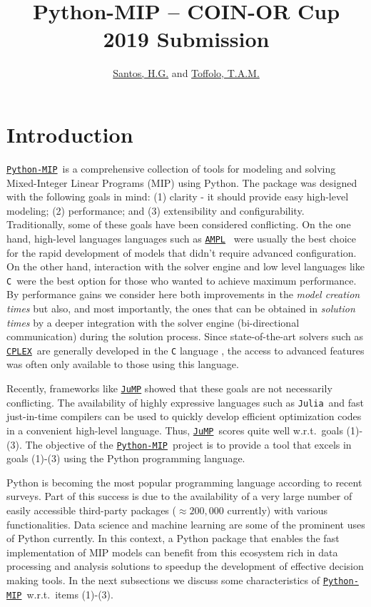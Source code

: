 \documentclass{article}
\title{Python-MIP -- COIN-OR Cup 2019 Submission }
\author{\href{http://www.decom.ufop.br/haroldo/}{Santos, H.G.} and \href{http://www.toffolo.com.br}{Toffolo, T.A.M.}}
\def\C{\texttt{C}}
\def\CPLEX{\href{https://www.ibm.com/analytics/cplex-optimizer}{\texttt{CPLEX}\textsuperscript{\textregistered}}}
\def\JuMP{\href{https://github.com/JuliaOpt/JuMP.jl}{\texttt{JuMP}}}
\def\Julia{\texttt{Julia}}
\def\PythonMIP{\href{https://github.com/coin-or/python-mip}{\texttt{Python-MIP}}}
\def\AMPL{\href{https://ampl.com}{\texttt{AMPL}}}
\begin{document}
\maketitle

\section{Introduction}

\PythonMIP\ is a comprehensive collection of tools for modeling and solving Mixed-Integer Linear Programs (MIP) using Python. 
The package was designed with the following goals in mind: (1) clarity - it should provide easy high-level modeling; (2) performance; and (3) extensibility and configurability.
Traditionally, some of these goals have been considered conflicting. 
On the one hand, high-level languages languages such as \AMPL\ \cite{Fourer1987} were usually the best choice for the rapid development of models that didn't require advanced configuration.
On the other hand, interaction with the solver engine and low level languages like \C\ were the best option for those who wanted to achieve maximum performance. 
By performance gains we consider here both improvements in the \emph{model creation times} but also, and most importantly, the ones that can be obtained in \emph{solution times} by a deeper integration with the solver engine (bi-directional communication) during the solution process.
Since state-of-the-art solvers such as \CPLEX\ are generally developed in the \texttt{C} language \cite{Bixby2002}, the access to advanced features was often only available to those using this language.

Recently, frameworks like \JuMP \cite{Dunning2015} showed that these goals are not necessarily conflicting.
The availability of highly expressive languages such as \Julia\ and fast just-in-time compilers can be used to quickly develop efficient optimization codes in a convenient high-level language. 
Thus, \JuMP\ scores quite well w.r.t.\ goals (1)-(3). 
The objective of the \PythonMIP\ project is to provide a tool that excels in goals (1)-(3) using the Python programming language.

Python is becoming the most popular \cite{Econ2018} programming language according to recent surveys. 
Part of this success is due to the availability of a very large number of easily accessible third-party packages ($\approx 200,000$ currently) with various functionalities. 
Data science and machine learning are some of the prominent uses of Python currently. 
In this context, a Python package that enables the fast implementation of MIP models can benefit from this ecosystem rich in data processing and analysis solutions to speedup the development of effective decision making tools. 
In the next subsections we discuss some characteristics of \PythonMIP\ w.r.t.\ items (1)-(3).
\end{document}
